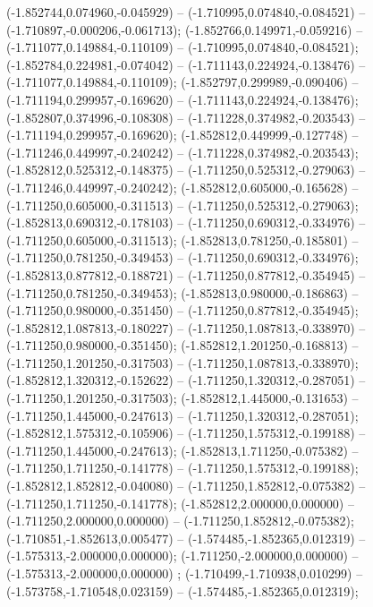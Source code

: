  (-1.852744,0.074960,-0.045929) -- (-1.710995,0.074840,-0.084521) -- (-1.710897,-0.000206,-0.061713);
 (-1.852766,0.149971,-0.059216) -- (-1.711077,0.149884,-0.110109) -- (-1.710995,0.074840,-0.084521);
 (-1.852784,0.224981,-0.074042) -- (-1.711143,0.224924,-0.138476) -- (-1.711077,0.149884,-0.110109);
 (-1.852797,0.299989,-0.090406) -- (-1.711194,0.299957,-0.169620) -- (-1.711143,0.224924,-0.138476);
 (-1.852807,0.374996,-0.108308) -- (-1.711228,0.374982,-0.203543) -- (-1.711194,0.299957,-0.169620);
 (-1.852812,0.449999,-0.127748) -- (-1.711246,0.449997,-0.240242) -- (-1.711228,0.374982,-0.203543);
 (-1.852812,0.525312,-0.148375) -- (-1.711250,0.525312,-0.279063) -- (-1.711246,0.449997,-0.240242);
 (-1.852812,0.605000,-0.165628) -- (-1.711250,0.605000,-0.311513) -- (-1.711250,0.525312,-0.279063);
 (-1.852813,0.690312,-0.178103) -- (-1.711250,0.690312,-0.334976) -- (-1.711250,0.605000,-0.311513);
 (-1.852813,0.781250,-0.185801) -- (-1.711250,0.781250,-0.349453) -- (-1.711250,0.690312,-0.334976);
 (-1.852813,0.877812,-0.188721) -- (-1.711250,0.877812,-0.354945) -- (-1.711250,0.781250,-0.349453);
 (-1.852813,0.980000,-0.186863) -- (-1.711250,0.980000,-0.351450) -- (-1.711250,0.877812,-0.354945);
 (-1.852812,1.087813,-0.180227) -- (-1.711250,1.087813,-0.338970) -- (-1.711250,0.980000,-0.351450);
 (-1.852812,1.201250,-0.168813) -- (-1.711250,1.201250,-0.317503) -- (-1.711250,1.087813,-0.338970);
 (-1.852812,1.320312,-0.152622) -- (-1.711250,1.320312,-0.287051) -- (-1.711250,1.201250,-0.317503);
 (-1.852812,1.445000,-0.131653) -- (-1.711250,1.445000,-0.247613) -- (-1.711250,1.320312,-0.287051);
 (-1.852812,1.575312,-0.105906) -- (-1.711250,1.575312,-0.199188) -- (-1.711250,1.445000,-0.247613);
 (-1.852813,1.711250,-0.075382) -- (-1.711250,1.711250,-0.141778) -- (-1.711250,1.575312,-0.199188);
 (-1.852812,1.852812,-0.040080) -- (-1.711250,1.852812,-0.075382) -- (-1.711250,1.711250,-0.141778);
 (-1.852812,2.000000,0.000000) -- (-1.711250,2.000000,0.000000) -- (-1.711250,1.852812,-0.075382);
 (-1.710851,-1.852613,0.005477) -- (-1.574485,-1.852365,0.012319) -- (-1.575313,-2.000000,0.000000);
 (-1.711250,-2.000000,0.000000) -- (-1.575313,-2.000000,0.000000) ;
 (-1.710499,-1.710938,0.010299) -- (-1.573758,-1.710548,0.023159) -- (-1.574485,-1.852365,0.012319);
